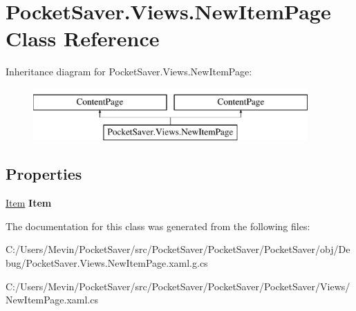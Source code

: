 \hypertarget{class_pocket_saver_1_1_views_1_1_new_item_page}{}\section{Pocket\+Saver.\+Views.\+New\+Item\+Page Class Reference}
\label{class_pocket_saver_1_1_views_1_1_new_item_page}
Inheritance diagram for Pocket\+Saver.\+Views.\+New\+Item\+Page\+:\begin{figure}[H]
\begin{center}
\leavevmode
\includegraphics[height=2.000000cm]{class_pocket_saver_1_1_views_1_1_new_item_page}
\end{center}
\end{figure}
\subsection*{Properties}
\begin{DoxyCompactItemize}
\item 
\mbox{\label{class_pocket_saver_1_1_views_1_1_new_item_page_abf4c99ff2acad5cfc5ac036ad0af2849}} 
\hyperlink{class_pocket_saver_1_1_models_1_1_item}{Item} {\bfseries Item}
\end{DoxyCompactItemize}


The documentation for this class was generated from the following files\+:\begin{DoxyCompactItemize}
\item 
C\+:/\+Users/\+Mevin/\+Pocket\+Saver/src/\+Pocket\+Saver/\+Pocket\+Saver/\+Pocket\+Saver/obj/\+Debug/Pocket\+Saver.\+Views.\+New\+Item\+Page.\+xaml.\+g.\+cs\item 
C\+:/\+Users/\+Mevin/\+Pocket\+Saver/src/\+Pocket\+Saver/\+Pocket\+Saver/\+Pocket\+Saver/\+Views/New\+Item\+Page.\+xaml.\+cs\end{DoxyCompactItemize}
